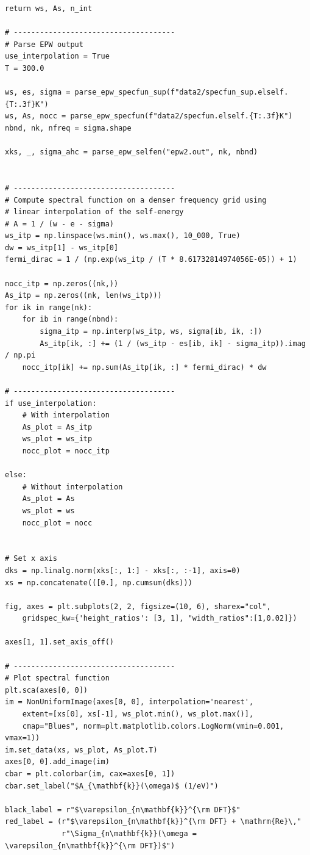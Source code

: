 \documentclass[a4paper,11pt,serif]{article}
\begin{document}
\begin{scriptsize}
\begin{Verbatim}[frame=single]
    return ws, As, n_int

# -------------------------------------
# Parse EPW output
use_interpolation = True
T = 300.0

ws, es, sigma = parse_epw_specfun_sup(f"data2/specfun_sup.elself.{T:.3f}K")
ws, As, nocc = parse_epw_specfun(f"data2/specfun.elself.{T:.3f}K")
nbnd, nk, nfreq = sigma.shape

xks, _, sigma_ahc = parse_epw_selfen("epw2.out", nk, nbnd)


# -------------------------------------
# Compute spectral function on a denser frequency grid using
# linear interpolation of the self-energy
# A = 1 / (w - e - sigma)
ws_itp = np.linspace(ws.min(), ws.max(), 10_000, True)
dw = ws_itp[1] - ws_itp[0]
fermi_dirac = 1 / (np.exp(ws_itp / (T * 8.61732814974056E-05)) + 1)

nocc_itp = np.zeros((nk,))
As_itp = np.zeros((nk, len(ws_itp)))
for ik in range(nk):
    for ib in range(nbnd):
        sigma_itp = np.interp(ws_itp, ws, sigma[ib, ik, :])
        As_itp[ik, :] += (1 / (ws_itp - es[ib, ik] - sigma_itp)).imag / np.pi
    nocc_itp[ik] += np.sum(As_itp[ik, :] * fermi_dirac) * dw

# -------------------------------------
if use_interpolation:
    # With interpolation
    As_plot = As_itp
    ws_plot = ws_itp
    nocc_plot = nocc_itp

else:
    # Without interpolation
    As_plot = As
    ws_plot = ws
    nocc_plot = nocc


# Set x axis
dks = np.linalg.norm(xks[:, 1:] - xks[:, :-1], axis=0)
xs = np.concatenate(([0.], np.cumsum(dks)))

fig, axes = plt.subplots(2, 2, figsize=(10, 6), sharex="col",
    gridspec_kw={'height_ratios': [3, 1], "width_ratios":[1,0.02]})

axes[1, 1].set_axis_off()

# -------------------------------------
# Plot spectral function
plt.sca(axes[0, 0])
im = NonUniformImage(axes[0, 0], interpolation='nearest',
    extent=[xs[0], xs[-1], ws_plot.min(), ws_plot.max()],
    cmap="Blues", norm=plt.matplotlib.colors.LogNorm(vmin=0.001, vmax=1))
im.set_data(xs, ws_plot, As_plot.T)
axes[0, 0].add_image(im)
cbar = plt.colorbar(im, cax=axes[0, 1])
cbar.set_label("$A_{\mathbf{k}}(\omega)$ (1/eV)")

black_label = r"$\varepsilon_{n\mathbf{k}}^{\rm DFT}$"
red_label = (r"$\varepsilon_{n\mathbf{k}}^{\rm DFT} + \mathrm{Re}\,"
             r"\Sigma_{n\mathbf{k}}(\omega = \varepsilon_{n\mathbf{k}}^{\rm DFT})$")


\end{Verbatim}
\end{scriptsize}
\end{document}
